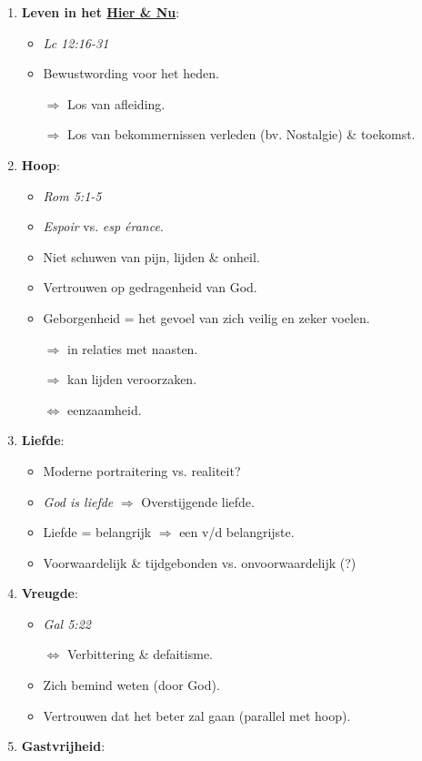 \begin{enumerate}
	\item \textbf{Leven in het \underline{Hier \& Nu}}:
	\begin{itemize}
		\item \textit{Lc 12:16-31}
		\item Bewustwording voor het heden.
		\item[$\Rightarrow$] Los van afleiding.
		\item[$\Rightarrow$] Los van bekommernissen verleden  (bv. Nostalgie) \& toekomst.
	\end{itemize}
	\item \textbf{Hoop}:
	\begin{itemize}
		\item \textit{Rom 5:1-5}
		\item \textit{Espoir} vs. \textit{esp \'{e}rance}.
		\item Niet schuwen van pijn, lijden \& onheil.
		\item Vertrouwen op gedragenheid van God.
		\item Geborgenheid = het gevoel van zich veilig en zeker voelen.
		\item[$\Rightarrow$] in relaties met naasten.
		\item[$\Rightarrow$] kan lijden veroorzaken.
		\item[$\Leftrightarrow$] eenzaamheid.
	\end{itemize}
	\item \textbf{Liefde}:
	\begin{itemize}
		\item Moderne portraitering vs. realiteit?
		\item \textit{God is liefde} $\Rightarrow$ Overstijgende liefde.
		\item Liefde = belangrijk $\Rightarrow$ een v/d belangrijste.
		\item Voorwaardelijk \& tijdgebonden vs. onvoorwaardelijk (?)
	\end{itemize}
	\item \textbf{Vreugde}:
	\begin{itemize}
		\item \textit{Gal 5:22}
		\item[$\Leftrightarrow$] Verbittering \& defaitisme.
		\item  Zich bemind weten (door God).
		\item Vertrouwen dat het beter zal gaan (parallel met hoop).
	\end{itemize}
	\item \textbf{Gastvrijheid}:

\end{enumerate}
